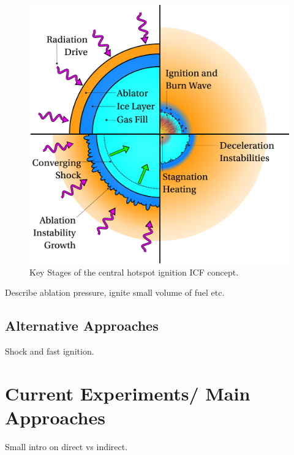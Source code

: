 \begin{figure}[t!]
    \includegraphics[width=0.7\linewidth]{Introduction/Images/hotspot ignition white.png}
    \centering
    \caption{Key Stages of the central hotspot ignition \ac{ICF} concept.
    }%
    \label{fig:intro_hotspot}
\end{figure}

Describe ablation pressure, ignite small volume of fuel etc.

\subsection{Alternative Approaches}%
\label{sec:intro_icf_alt}

Shock and fast ignition.

\section{Current Experiments/ Main Approaches}%
\label{sec:intro_mainexperiments}

Small intro on direct vs indirect.


